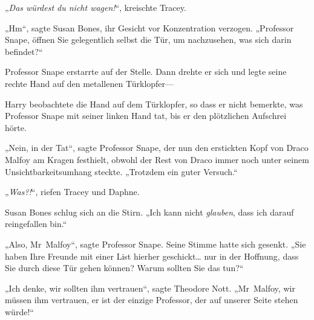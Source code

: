 „\emph{Das würdest du nicht wagen!}“, kreischte Tracey.

„Hm“, sagte Susan Bones, ihr Gesicht vor Konzentration verzogen. „Professor Snape, öffnen Sie gelegentlich selbst die Tür, um nachzusehen, was sich darin befindet?“

Professor Snape erstarrte auf der Stelle. Dann drehte er sich und legte seine rechte Hand auf den metallenen Türklopfer—

Harry beobachtete die Hand auf dem Türklopfer, so dass er nicht bemerkte, was Professor Snape mit seiner linken Hand tat, bis er den plötzlichen Aufschrei hörte.

„Nein, in der Tat“, sagte Professor Snape, der nun den erstickten Kopf von Draco Malfoy am Kragen festhielt, obwohl der Rest von Draco immer noch unter seinem Unsichtbarkeitsumhang steckte. „Trotzdem ein guter Versuch.“

„\emph{Was?!}“, riefen Tracey und Daphne.

Susan Bones schlug sich an die Stirn. „Ich kann nicht \emph{glauben}, dass ich darauf reingefallen bin.“

„Also, Mr~Malfoy“, sagte Professor Snape. Seine Stimme hatte sich gesenkt.
„Sie haben Ihre Freunde mit einer List hierher geschickt… nur in der Hoffnung, dass Sie durch diese Tür gehen können? Warum sollten Sie das tun?“

„Ich denke, wir sollten ihm vertrauen“, sagte Theodore Nott. „Mr~Malfoy, wir müssen ihm vertrauen, er ist der einzige Professor, der auf unserer Seite stehen würde!“

